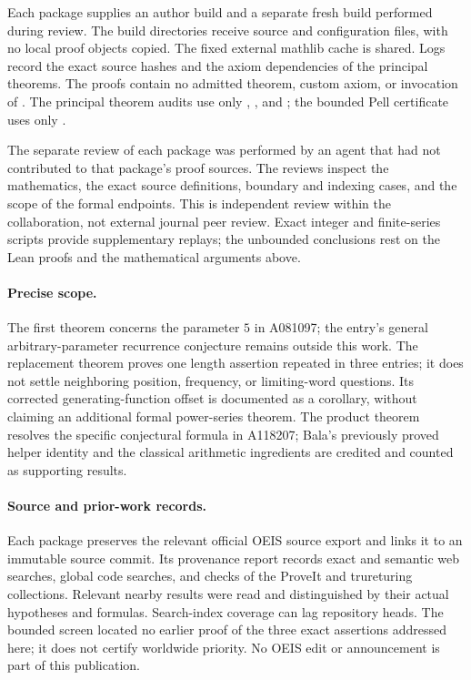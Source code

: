 \documentclass[11pt]{article}
\begin{document}
Each package supplies an author build and a separate fresh build performed
during review. The build directories receive source and configuration
files, with no local proof objects copied. The fixed external mathlib
cache is shared. Logs record the exact source hashes and the axiom
dependencies of the principal theorems. The proofs contain no admitted
theorem, custom axiom, or invocation of . The
principal theorem audits use only , ,
and ; the bounded Pell certificate uses only
.

The separate review of each package was performed by an agent that had
not contributed to that package's proof sources. The reviews inspect
the mathematics, the exact source definitions, boundary and indexing
cases, and the scope of the formal endpoints. This is independent review
within the collaboration, not external journal peer review. Exact
integer and finite-series scripts provide supplementary replays; the
unbounded conclusions rest on the Lean proofs and the mathematical
arguments above.

\paragraph{Precise scope.}
The first theorem concerns the parameter $5$ in A081097; the entry's
general arbitrary-parameter recurrence conjecture remains outside this
work. The replacement theorem proves one length assertion repeated in
three entries; it does not settle neighboring position, frequency, or
limiting-word questions. Its corrected generating-function offset is
documented as a corollary, without claiming an additional formal
power-series theorem. The product theorem resolves the specific
conjectural formula in A118207; Bala's previously proved helper identity
and the classical arithmetic ingredients are credited and counted as
supporting results.

\paragraph{Source and prior-work records.}
Each package preserves the relevant official OEIS source export and
links it to an immutable source commit. Its provenance report records
exact and semantic web searches, global code searches, and checks of
the ProveIt and trureturing collections. Relevant nearby results were
read and distinguished by their actual hypotheses and formulas.
Search-index coverage can lag repository heads. The bounded screen
located no earlier proof of the three exact assertions addressed here;
it does not certify worldwide priority. No OEIS edit or announcement
is part of this publication.
\end{document}
